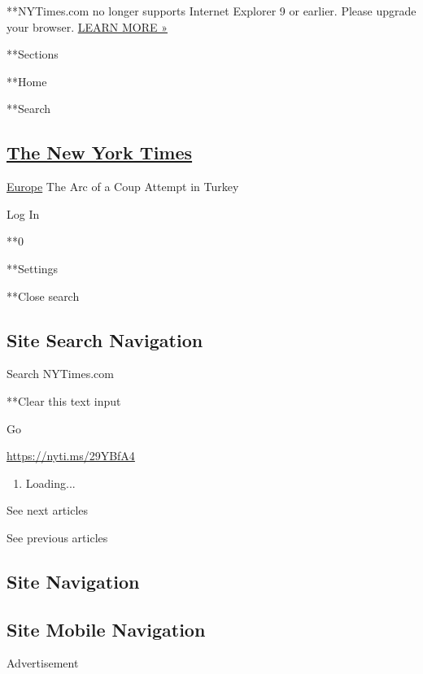  **NYTimes.com no longer supports Internet Explorer 9 or earlier. Please
upgrade your browser.
\href{http://www.nytimes.com/content/help/site/ie9-support.html}{LEARN
MORE »}

**Sections

**Home

**Search

\hypertarget{the-new-york-times}{%
\subsection{\texorpdfstring{\href{http://www.nytimes.com/}{The New York
Times}}{The New York Times}}\label{the-new-york-times}}

 \href{/section/world/europe}{Europe} \textbar{}The Arc of a Coup
Attempt in Turkey

Log In

**0

**Settings

**Close search

\hypertarget{site-search-navigation}{%
\subsection{Site Search Navigation}\label{site-search-navigation}}

Search NYTimes.com

**Clear this text input

Go

\url{https://nyti.ms/29YBfA4}

\begin{enumerate}
\def\labelenumi{\arabic{enumi}.}
\item
  Loading...
\end{enumerate}

See next articles

See previous articles

\hypertarget{site-navigation}{%
\subsection{Site Navigation}\label{site-navigation}}

\hypertarget{site-mobile-navigation}{%
\subsection{Site Mobile Navigation}\label{site-mobile-navigation}}

Advertisement

